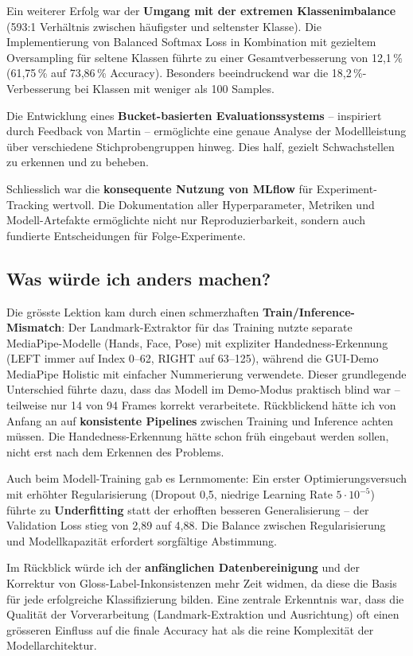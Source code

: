 Ein weiterer Erfolg war der \textbf{Umgang mit der extremen Klassenimbalance} (593:1 Verhältnis zwischen häufigster und seltenster Klasse). Die Implementierung von Balanced Softmax Loss in Kombination mit gezieltem Oversampling für seltene Klassen führte zu einer Gesamtverbesserung von 12,1\,\% (61,75\,\% auf 73,86\,\% Accuracy). Besonders beeindruckend war die 18,2\,\%-Verbesserung bei Klassen mit weniger als 100 Samples.

Die Entwicklung eines \textbf{Bucket-basierten Evaluationssystems} -- inspiriert durch Feedback von Martin -- ermöglichte eine genaue Analyse der Modellleistung über verschiedene Stichprobengruppen hinweg. Dies half, gezielt Schwachstellen zu erkennen und zu beheben.

Schliesslich war die \textbf{konsequente Nutzung von MLflow} für Experiment-Tracking wertvoll. Die Dokumentation aller Hyperparameter, Metriken und Modell-Artefakte ermöglichte nicht nur Reproduzierbarkeit, sondern auch fundierte Entscheidungen für Folge-Experimente.

\subsection{Was würde ich anders machen?}
Die grösste Lektion kam durch einen schmerzhaften \textbf{Train/Inference-Mismatch}: Der Landmark-Extraktor für das Training nutzte separate MediaPipe-Modelle (Hands, Face, Pose) mit expliziter Handedness-Erkennung (LEFT immer auf Index 0--62, RIGHT auf 63--125), während die GUI-Demo MediaPipe Holistic mit einfacher Nummerierung verwendete. Dieser grundlegende Unterschied führte dazu, dass das Modell im Demo-Modus praktisch blind war -- teilweise nur 14 von 94 Frames korrekt verarbeitete. Rückblickend hätte ich von Anfang an auf \textbf{konsistente Pipelines} zwischen Training und Inference achten müssen. Die Handedness-Erkennung hätte schon früh eingebaut werden sollen, nicht erst nach dem Erkennen des Problems.

Auch beim Modell-Training gab es Lernmomente: Ein erster Optimierungsversuch mit erhöhter Regularisierung (Dropout 0,5, niedrige Learning Rate $5 \cdot 10^{-5}$) führte zu \textbf{Underfitting} statt der erhofften besseren Generalisierung -- der Validation Loss stieg von 2,89 auf 4,88. Die Balance zwischen Regularisierung und Modellkapazität erfordert sorgfältige Abstimmung.

Im Rückblick würde ich der \textbf{anfänglichen Datenbereinigung} und der Korrektur von Gloss-Label-Inkonsistenzen mehr Zeit widmen, da diese die Basis für jede erfolgreiche Klassifizierung bilden. Eine zentrale Erkenntnis war, dass die Qualität der Vorverarbeitung (Landmark-Extraktion und Ausrichtung) oft einen grösseren Einfluss auf die finale Accuracy hat als die reine Komplexität der Modellarchitektur.

